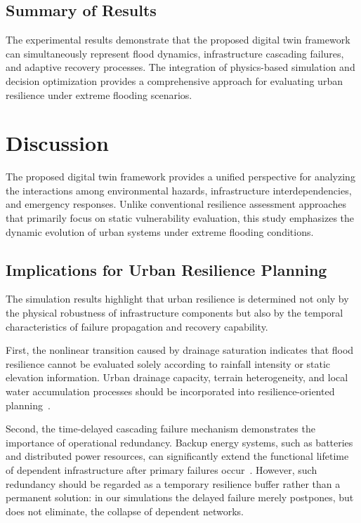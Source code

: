 \documentclass[preprint,12pt]{elsarticle}
\begin{document}
\subsection{Summary of Results}
The experimental results demonstrate that the proposed digital twin framework
can simultaneously represent flood dynamics, infrastructure cascading
failures, and adaptive recovery processes. The integration of physics-based
simulation and decision optimization provides a comprehensive approach for
evaluating urban resilience under extreme flooding scenarios.

\section{Discussion}\label{sec:discussion}

The proposed digital twin framework provides a unified perspective for
analyzing the interactions among environmental hazards, infrastructure
interdependencies, and emergency responses. Unlike conventional resilience
assessment approaches that primarily focus on static vulnerability
evaluation, this study emphasizes the dynamic evolution of urban systems
under extreme flooding conditions.

\subsection{Implications for Urban Resilience Planning}
The simulation results highlight that urban resilience is determined not only
by the physical robustness of infrastructure components but also by the
temporal characteristics of failure propagation and recovery capability.

First, the nonlinear transition caused by drainage saturation indicates that
flood resilience cannot be evaluated solely according to rainfall intensity
or static elevation information. Urban drainage capacity, terrain
heterogeneity, and local water accumulation processes should be incorporated
into resilience-oriented planning~\cite{bates2010simple,
guidolin2016weighted}.

Second, the time-delayed cascading failure mechanism demonstrates the
importance of operational redundancy. Backup energy systems, such as
batteries and distributed power resources, can significantly extend the
functional lifetime of dependent infrastructure after primary failures
occur~\cite{panteli2015grid}. However, such redundancy should be regarded as
a temporary resilience buffer rather than a permanent solution: in our
simulations the delayed failure merely postpones, but does not eliminate,
the collapse of dependent networks.
\end{document}
